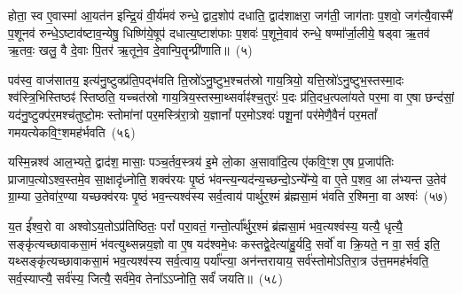 होता॒ स्व ए॒वास्मा॑ आ॒यत॑न इन्द्रि॒यं वी॒र्य॑मव॑ रुन्धे॒ द्वाद॒शोप॑ दधाति॒ द्वाद॑शाक्षरा॒ जग॑ती॒ जाग॑ताः प॒शवो॒ जग॑त्यै॒वास्मै॑ प॒शूनव॑ रुन्धे॒\-ऽष्टाव॑ष्टाव॒न्येषु॒ धिष्णि॑ये॒षूप॑ दधात्य॒ष्टाश॑फाः प॒शवः॑ प॒शूने॒वाव॑ रुन्धे॒ षण्मा᳚र्जा॒लीये॒ षड्वा ऋ॒तव॑ ऋ॒तवः॒ खलु॒ वै दे॒वाः पि॒तर॑ ऋ॒तूने॒व दे॒वान्पि॒तॄन्प्री॑णाति॥~(५)

{}%

पव॑स्व॒ वाज॑सातय॒ इत्य॑नु॒ष्टुक्प्र॑ति॒पद्भ॑वति ति॒स्रो॑\-ऽनु॒ष्टुभ॒श्चत॑स्रो गाय॒त्रियो॒ यत्ति॒स्रो॑\-ऽनु॒ष्टुभ॒स्तस्मा॒दः श्व॑स्त्रि॒भिस्तिष्ठꣴ॑ स्तिष्ठति॒ यच्चत॑स्रो गाय॒त्रिय॒स्तस्मा॒थ्सर्वाꣴ॑श्च॒तुरः॑ प॒दः प्र॑ति॒दध॒त्पला॑यते पर॒मा वा ए॒षा छन्द॑सां॒ यद॑नु॒ष्टुक्प॑र॒मश्च॑तुष्टो॒मः स्तोमा॑नां पर॒मस्त्रि॑रा॒त्रो य॒ज्ञानां᳚ पर॒मो\-ऽश्वः॑ पशू॒नां पर॑मेणै॒वैनं॑ पर॒मतां᳚ गमयत्येकवि॒ꣳ॒शमह॑र्भवति~(५६)

यस्मि॒न्नश्व॑ आल॒भ्यते॒ द्वाद॑श॒ मासाः॒ पञ्च॒र्तव॒स्त्रय॑ इ॒मे लो॒का अ॒सावा॑दि॒त्य ए॑कवि॒ꣳ॒श ए॒ष प्र॒जा\-प॑तिः प्राजाप॒त्यो\-ऽश्व॒स्तमे॒व सा॒क्षादृ॑ध्नोति॒ शक्व॑रयः पृ॒ष्ठं भ॑वन्त्य॒न्यद॑न्य॒च्छन्दो॒\-ऽन्ये᳚न्ये॒ वा ए॒ते प॒शव॒ आ ल॑भ्यन्त उ॒तेव॑ ग्रा॒म्या उ॒तेवा॑र॒ण्या यच्छक्व॑रयः पृ॒ष्ठं भव॒न्त्यश्व॑स्य सर्व॒त्वाय॑ पार्थुर॒श्मं ब्र॑ह्मसा॒मं भ॑वति र॒श्मिना॒ वा अश्वः॑~(५७)

य॒त ई᳚श्व॒रो वा अश्वो\-ऽय॒तो\-ऽप्र॑तिष्ठितः॒ परां᳚ परा॒वतं॒ गन्तो॒र्त्पा᳚र्थुर॒श्मं ब्र॑ह्मसा॒मं भव॒त्यश्व॑स्य॒ यत्यै॒ धृत्यै॒ सङ्कृ॑त्यच्छावाकसा॒मं भ॑वत्युथ्सन्नय॒ज्ञो वा ए॒ष यद॑श्वमे॒धः कस्तद्वे॒देत्या॑हु॒र्यदि॒ सर्वो॑ वा क्रि॒यते॒ न वा॒ सर्व॒ इति॒ यथ्सङ्कृ॑त्यच्छावाकसा॒मं भव॒त्यश्व॑स्य सर्व॒त्वाय॒ पर्या᳚प्त्या॒ अन॑न्तरायाय॒ सर्व॑स्तोमो\-ऽतिरा॒त्र उ॑त्त॒ममह॑र्भवति॒ सर्व॒स्याप्त्यै॒ सर्व॑स्य॒ जित्यै॒ सर्व॑मे॒व तेना᳚\-ऽऽ\-प्नोति॒ सर्वं॑ जयति॥~(५८)

{}%

{}

